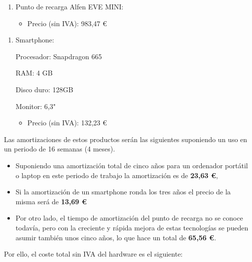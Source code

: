 \documentclass[12pt,a4paper,onecolumn,oneside]{report}
\begin{document}
\begin{enumerate}
	
	\item Punto de recarga Alfen EVE MINI:
		
	\begin{itemize}
		\item Precio (sin IVA): 983,47 \euro\\
	\end{itemize}
	
\end{enumerate}

\begin{enumerate}
	
	\item Smartphone:
	
	Procesador: Snapdragon 665
	
	RAM: 4 GB
	
	Disco duro: 128GB
	
	Monitor: 6,3"
	
	\begin{itemize}
		\item Precio (sin IVA): 132,23 \euro\\
	\end{itemize}
	
\end{enumerate}

Las amortizaciones de estos productos serán las siguientes suponiendo un uso en un periodo de 16 semanas (4 meses).

\begin{itemize}
\item Suponiendo una amortización total de cinco años para un ordenador portátil o laptop en este periodo de trabajo la amortización es de \textbf{23,63 \euro},
\item Si la amortización de un smartphone ronda los tres años el precio de la misma será de \textbf{13,69 \euro} 
\item Por otro lado, el tiempo de amortización del punto de recarga no se conoce todavía, pero con la creciente y rápida mejora de estas tecnologías se pueden asumir también unos cinco años, lo que hace un total de \textbf{65,56 \euro}.
\end{itemize}

Por ello, el coste total sin IVA del hardware es el siguiente:

\begin{table}[ht]
	\centering
	\caption{Presupuesto del hardware sin IVA}
	\label{tablacostehardware}
\end{table}
\end{document}
